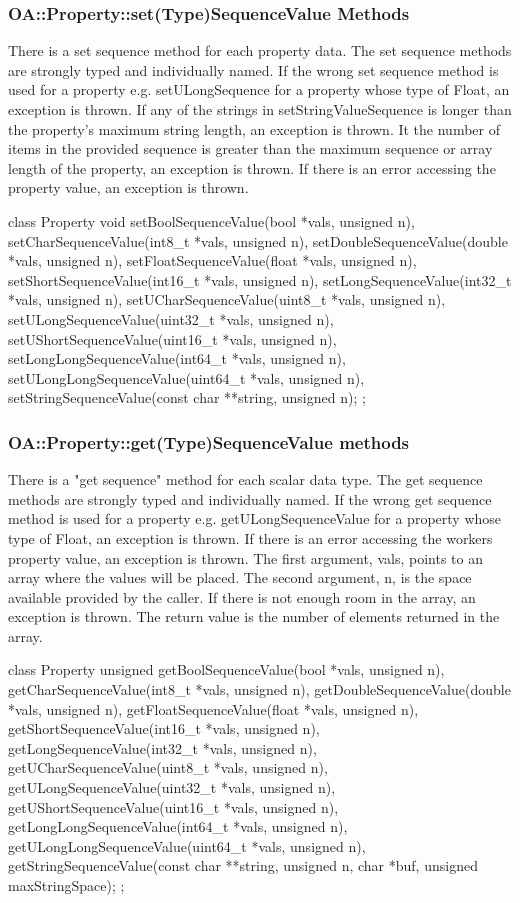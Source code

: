 \documentclass[10pt, a4paper, oneside]{article}
\renewcommand\_{\textunderscore\allowbreak} %
\begin{document}
\subsubsection{OA::Property::set(Type)SequenceValue Methods} 
There is a set sequence method for each property data. The set sequence methods are strongly typed and individually named. If the wrong set sequence method is used for a property e.g. setULongSequence for a property whose type of Float, an exception is thrown. If any of the strings in setStringValueSequence is longer than the property's maximum string length, an exception is thrown. It the number of items in the provided sequence is greater than the maximum sequence or array length of the property, an exception is thrown. If there is an error accessing the property value, an exception is thrown.
\begin{ocpixml}  
class Property {
  void
  setBoolSequenceValue(bool *vals, unsigned n),
  setCharSequenceValue(int8_t *vals, unsigned n),
  setDoubleSequenceValue(double *vals, unsigned n),
  setFloatSequenceValue(float *vals, unsigned n),
  setShortSequenceValue(int16_t *vals, unsigned n),
  setLongSequenceValue(int32_t *vals, unsigned n),
  setUCharSequenceValue(uint8_t *vals, unsigned n),
  setULongSequenceValue(uint32_t *vals, unsigned n),
  setUShortSequenceValue(uint16_t *vals, unsigned n),
  setLongLongSequenceValue(int64_t *vals, unsigned n),
  setULongLongSequenceValue(uint64_t *vals, unsigned n),
  setStringSequenceValue(const char **string, unsigned n);
}; \end{ocpixml} 
\subsubsection {OA::Property::get(Type)SequenceValue methods} 
There is a "get sequence" method for each scalar data type. The get sequence methods are strongly typed and individually named.  If the wrong get sequence method is used for a property e.g. getULongSequenceValue for a property whose type of Float, an exception is thrown. If there is an error accessing the workers property value, an exception is thrown. The first argument, vals, points to an array where the values will be placed.  The second argument, n, is the space available provided by the caller.  If there is not enough room in the array, an exception is thrown.  The return value is the number of elements returned in the array.
\begin{ocpixml}  
class Property {
 unsigned
  getBoolSequenceValue(bool *vals, unsigned n),
  getCharSequenceValue(int8_t *vals, unsigned n),
  getDoubleSequenceValue(double *vals, unsigned n),
  getFloatSequenceValue(float *vals, unsigned n),
  getShortSequenceValue(int16_t *vals, unsigned n),
  getLongSequenceValue(int32_t *vals, unsigned n),
  getUCharSequenceValue(uint8_t *vals, unsigned n),
  getULongSequenceValue(uint32_t *vals, unsigned n),
  getUShortSequenceValue(uint16_t *vals, unsigned n),
  getLongLongSequenceValue(int64_t *vals, unsigned n),
  getULongLongSequenceValue(uint64_t *vals, unsigned n),
  getStringSequenceValue(const char **string, unsigned n,
  char *buf, unsigned maxStringSpace);
};\end{ocpixml} 
\end{document}

